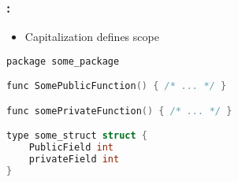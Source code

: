 \begin{frame}[fragile]
    \frametitle{\secname: \small\subsecname\normalsize}

    \begin{itemize}
        \item Capitalization defines scope
    \end{itemize}


    \small \begin{lstlisting}[language=c]
package some_package

func SomePublicFunction() { /* ... */ }

func somePrivateFunction() { /* ... */ }

type some_struct struct {
    PublicField int
    privateField int
}
    \end{lstlisting} \normalsize
\end{frame}
